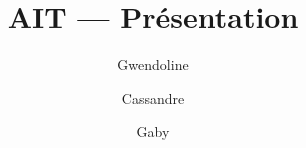 \documentclass{beamer}
\title{AIT --- Présentation}
\author{Gwendoline \and Cassandre \and Gaby}
\begin{document}
\begin{frame}
  \titlepage
\end{frame}
\end{document}

